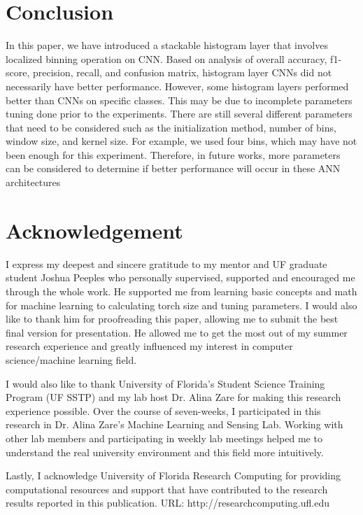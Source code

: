 \documentclass[10pt,twocolumn,letterpaper]{article}
\begin{document}
\section{Conclusion}

In this paper, we have introduced a stackable histogram layer that involves localized binning operation on CNN. Based on analysis of overall accuracy, f1-score, precision, recall, and confusion matrix, histogram layer CNNs did not necessarily have better performance. However, some histogram layers performed better than CNNs on specific classes. This may be due to incomplete parameters tuning done prior to the experiments. There are still several different parameters that need to be considered such as the initialization method, number of bins, window size, and kernel size. For example, we used four bins, which may have not been enough for this experiment. Therefore, in future works, more parameters can be considered to determine if better performance will occur in these ANN architectures

\section{Acknowledgement}
I express my deepest and sincere gratitude to my mentor and UF graduate student Joshua Peeples who personally supervised, supported and encouraged me through the whole work. He supported me from learning basic concepts and math for machine learning to calculating torch size and tuning parameters. I would also like to thank him for proofreading this paper, allowing me to submit the best final version for presentation. He allowed me to get the most out of my summer research experience and greatly influenced my interest in computer science/machine learning field.

I would also like to thank University of Florida's Student Science Training Program (UF SSTP) and my lab host Dr. Alina Zare for making this research experience possible. Over the course of seven-weeks, I participated in this research in Dr. Alina Zare's Machine Learning and Sensing Lab. Working with other lab members and participating in weekly lab meetings helped me to understand the real university environment and this field more intuitively.

Lastly, I acknowledge University of Florida Research Computing for providing computational resources and support that have contributed to the research results reported in this publication.
URL: http://researchcomputing.ufl.edu
\end{document}
